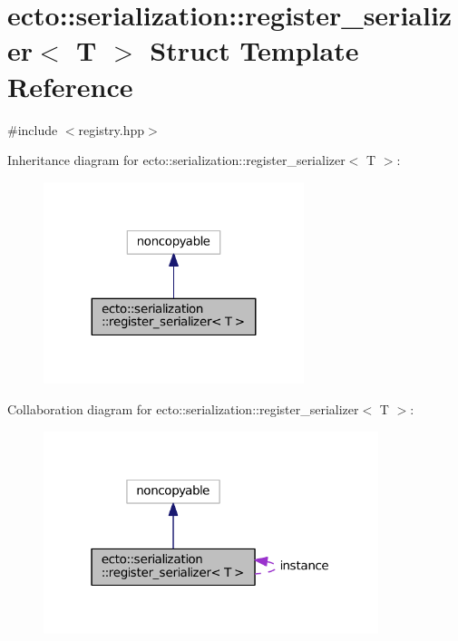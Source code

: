 \hypertarget{structecto_1_1serialization_1_1register__serializer}{}\section{ecto\+:\+:serialization\+:\+:register\+\_\+serializer$<$ T $>$ Struct Template Reference}
\label{structecto_1_1serialization_1_1register__serializer}


{\ttfamily \#include $<$registry.\+hpp$>$}



Inheritance diagram for ecto\+:\+:serialization\+:\+:register\+\_\+serializer$<$ T $>$\+:\nopagebreak
\begin{figure}[H]
\begin{center}
\leavevmode
\includegraphics[width=215pt]{structecto_1_1serialization_1_1register__serializer__inherit__graph}
\end{center}
\end{figure}


Collaboration diagram for ecto\+:\+:serialization\+:\+:register\+\_\+serializer$<$ T $>$\+:\nopagebreak
\begin{figure}[H]
\begin{center}
\leavevmode
\includegraphics[width=277pt]{structecto_1_1serialization_1_1register__serializer__coll__graph}
\end{center}
\end{figure}
